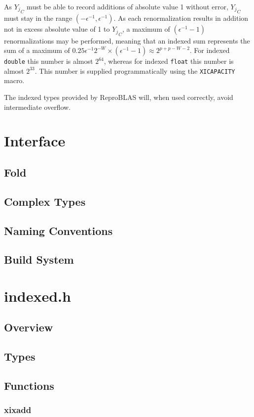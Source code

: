 \documentclass[12pt]{article}
\theoremstyle{plain}
\begin{document}
    As ${Y_j}_C$ must be able to record additions of absolute value 1 without error, ${Y_j}_C$ must stay in the range $(-\epsilon^{-1}, \epsilon^{-1})$. As each renormalization results in addition not in excess absolute value of 1 to ${Y_j}_C$, a maximum of $(\epsilon^{-1} - 1)$ renormalizations may be performed, meaning that an indexed sum represents the sum of a maximum of $0.25\epsilon^{-1}2^{-W} \times (\epsilon^{-1} - 1) \approx 2^{p + p - W - 2}$. For indexed \verb|double| this number is almost $2^64$, whereas for indexed \verb|float| this number is almost $2^33$. This number is supplied programmatically using the \verb|XICAPACITY| macro.

    The indexed types provided by ReproBLAS will, when used correctly, avoid intermediate overflow.

\section{Interface}
  \subsection{Fold}
  \subsection{Complex Types}
  \subsection{Naming Conventions}
  \subsection{Build System}
\section{indexed.h}
  \subsection{Overview}
  \subsection{Types}
  \subsection{Functions}
    \subsubsection{xixadd}
\end{document}
